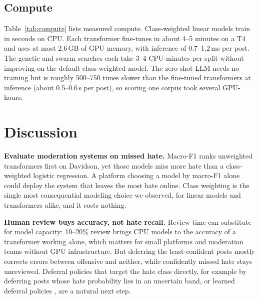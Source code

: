 \documentclass[lettersize,journal]{IEEEtran}
\begin{document}
\subsection{Compute}
\begin{table}[t]
\centering
\caption{Compute per Split (Davidson / HateXplain): Training Time, Inference Time, and Measured Peak GPU Memory. $^{a}$From the Scoring Log (About 620\,s per 1{,}000 Posts). $^{b}$Size of the 16-Bit Model Weights, Not a Measured Peak.}
\label{tab:compute}
\scriptsize
\setlength{\tabcolsep}{2.4pt}

\end{table}

Table~\ref{tab:compute} lists measured compute. Class-weighted linear models train in seconds on CPU. Each transformer fine-tunes in about 4--5 minutes on a T4 and uses at most 2.6\,GB of GPU memory, with inference of 0.7--1.2\,ms per post. The genetic and swarm searches each take 3--4 CPU-minutes per split without improving on the default class-weighted model. The zero-shot LLM needs no training but is roughly 500--750 times slower than the fine-tuned transformers at inference (about 0.5--0.6\,s per post), so scoring one corpus took several GPU-hours.

\section{Discussion}
\textbf{Evaluate moderation systems on missed hate.} Macro-F1 ranks unweighted transformers first on Davidson, yet those models miss more hate than a class-weighted logistic regression. A platform choosing a model by macro-F1 alone could deploy the system that leaves the most hate online. Class weighting is the single most consequential modeling choice we observed, for linear models and transformers alike, and it costs nothing.

\textbf{Human review buys accuracy, not hate recall.} Review time can substitute for model capacity: 10--20\% review brings CPU models to the accuracy of a transformer working alone, which matters for small platforms and moderation teams without GPU infrastructure. But deferring the least-confident posts mostly corrects errors between offensive and neither, while confidently missed hate stays unreviewed. Deferral policies that target the hate class directly, for example by deferring posts whose hate probability lies in an uncertain band, or learned deferral policies \cite{madras2018predict,mozannar2020consistent}, are a natural next step.
\end{document}
